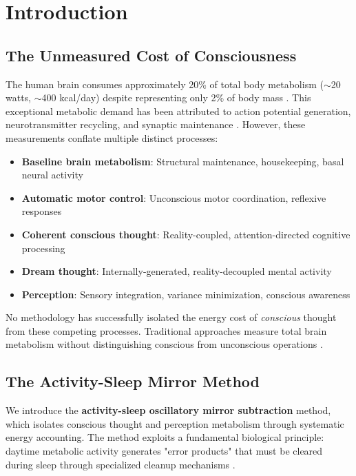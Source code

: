 \documentclass[12pt,twocolumn]{article}
\theoremstyle{remark}
\begin{document}
\section{Introduction}

\subsection{The Unmeasured Cost of Consciousness}

The human brain consumes approximately 20\% of total body metabolism ($\sim$20 watts, $\sim$400 kcal/day) despite representing only 2\% of body mass \citep{raichle2002appraising,clarke2008cerebral}. This exceptional metabolic demand has been attributed to action potential generation, neurotransmitter recycling, and synaptic maintenance \citep{attwell2001energy}. However, these measurements conflate multiple distinct processes:

\begin{itemize}
\item \textbf{Baseline brain metabolism}: Structural maintenance, housekeeping, basal neural activity
\item \textbf{Automatic motor control}: Unconscious motor coordination, reflexive responses
\item \textbf{Coherent conscious thought}: Reality-coupled, attention-directed cognitive processing
\item \textbf{Dream thought}: Internally-generated, reality-decoupled mental activity
\item \textbf{Perception}: Sensory integration, variance minimization, conscious awareness
\end{itemize}

No methodology has successfully isolated the energy cost of \textit{conscious} thought from these competing processes. Traditional approaches measure total brain metabolism without distinguishing conscious from unconscious operations \citep{shulman2004energetic,magistretti2006cellular}.

\subsection{The Activity-Sleep Mirror Method}

We introduce the \textbf{activity-sleep oscillatory mirror subtraction} method, which isolates conscious thought and perception metabolism through systematic energy accounting. The method exploits a fundamental biological principle: daytime metabolic activity generates "error products" that must be cleared during sleep through specialized cleanup mechanisms \citep{xie2013sleep,nedergaard2013garbage}.
\end{document}
